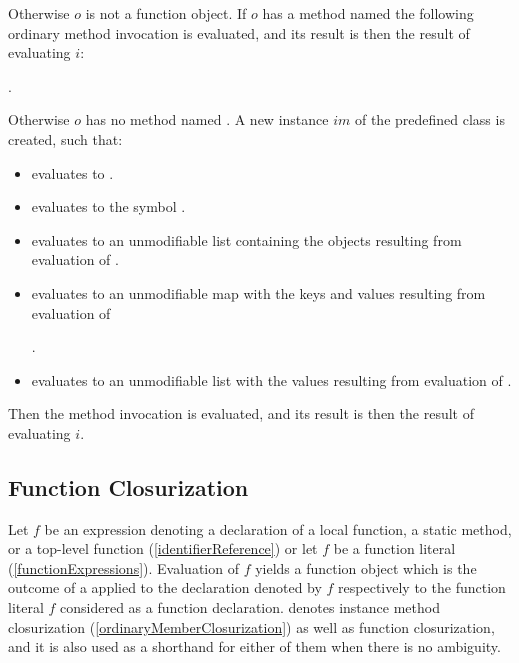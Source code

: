 \documentclass[makeidx]{article}
\begin{document}
{\LMHash{}%
Otherwise $o$ is not a function object.
If $o$ has a method named \CALL{}
the following ordinary method invocation is evaluated,
and its result is then the result of evaluating $i$:

\noindent
{}.

\LMHash{}%
Otherwise $o$ has no method named \CALL{}.
A new instance $im$ of the predefined class  is created, such that:
\begin{itemize}
\item {} evaluates to \code{\TRUE{}}.
\item {} evaluates to the symbol .
\item {} evaluates to an unmodifiable list
  containing the objects resulting from evaluation of
  .
\item {} evaluates to an unmodifiable map
  with the keys and values resulting from evaluation of

  .
\item {} evaluates to an unmodifiable list
  with the values resulting from evaluation of
  .
\end{itemize}

\LMHash{}%
Then the method invocation  is evaluated,
and its result is then the result of evaluating $i$.



\subsection{Function Closurization}

\LMHash{}%
Let $f$ be an expression denoting
a declaration of a local function, a static method, or a top-level function
(\ref{identifierReference})
or let $f$ be a function literal
(\ref{functionExpressions}).
Evaluation of $f$ yields a function object
which is the outcome of a 
applied to the declaration denoted by $f$
respectively to the function literal $f$ considered as a function declaration.
denotes instance method closurization
(\ref{ordinaryMemberClosurization})
as well as function closurization,
and it is also used as a shorthand for either of them when there is no ambiguity.

}
\end{document}
